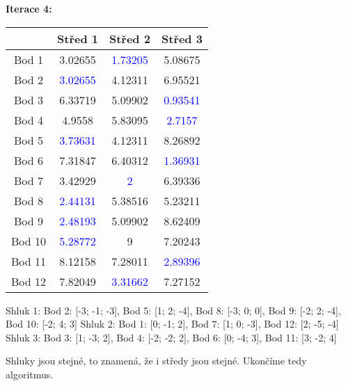 \documentclass[12pt]{article}
\begin{document}
\newpage

\textbf{Iterace 4:} \newline
\begin{table}[!ht]
    \renewcommand{\arraystretch}{1.3}
    \centering
    \setlength{\tabcolsep}{20pt}
    \begin{tabular}{|c|c|c|c|}
    
    \hline
        & Střed 1 & Střed 2 & Střed 3 \\ \hline
        Bod 1 & 3.02655 & \textcolor{blue}{1.73205} & 5.08675 \\ \hline
        Bod 2 & \textcolor{blue}{3.02655} & 4.12311 & 6.95521  \\ \hline
        Bod 3 & 6.33719 & 5.09902 & \textcolor{blue}{0.93541}  \\ \hline
        Bod 4 & 4.9558 & 5.83095 & \textcolor{blue}{2.7157}  \\ \hline
        Bod 5 & \textcolor{blue}{3.73631} & 4.12311 & 8.26892 \\ \hline
        Bod 6 & 7.31847 & 6.40312 & \textcolor{blue}{1.36931} \\ \hline
        Bod 7 & 3.42929 & \textcolor{blue}{2} & 6.39336  \\ \hline
        Bod 8 & \textcolor{blue}{2.44131} & 5.38516 & 5.23211 \\ \hline
        Bod 9 & \textcolor{blue}{2.48193} & 5.09902 & 8.62409 \\ \hline
        Bod 10 & \textcolor{blue}{5.28772} & 9 & 7.20243 \\ \hline
        Bod 11 & 8.12158 & 7.28011 & \textcolor{blue}{2.89396}  \\ \hline
        Bod 12 & 7.82049 & \textcolor{blue}{3.31662} & 7.27152 \\
    \hline
    \end{tabular}
    \label{tab:iterace1}
\end{table}
\newline
Shluk 1: Bod 2: [-3; -1; -3], Bod 5: [1; 2; -4], Bod 8: [-3; 0; 0], Bod 9: [-2; 2; -4], \newline 
\null\quad\quad\qquad   Bod 10: [-2; 4; 3] \newline
Shluk 2: Bod 1: [0; -1; 2], Bod 7: [1; 0; -3], Bod 12: [2; -5; -4] \newline
Shluk 3: Bod 3: [1; -3; 2], Bod 4: [-2; -2; 2], Bod 6: [0; -4; 3], Bod 11: [3; -2; 4]

\vspace{0.5cm}

Shluky jsou stejné, to znamená, že i středy jsou stejné. Ukončíme tedy algoritmus.
\end{document}

